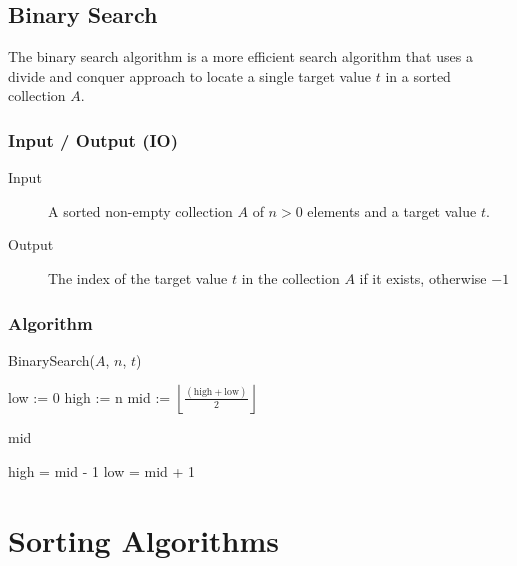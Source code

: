 \documentclass[12pt letter]{report}
\begin{document}
\section{Binary Search}

The binary search algorithm is a more efficient search algorithm that uses a divide and conquer approach to locate a
single target value $t$ in a sorted collection $A$.

\subsection{Input / Output (IO)}

\begin{description}
  \item[Input] A sorted non-empty collection $A$ of $n > 0$ elements and a target value $t$.
  \item[Output] The index of the target value $t$ in the collection $A$ if it exists, otherwise $-1$
\end{description}

\subsection{Algorithm}

\begin{algorithm}[H]
  \caption{BinarySearch($A$, $n$, $t$)}
  \begin{algorithmic}[1]
    \State low := 0
    \State high := n
    \State mid := $\left\lfloor \frac{ \left( \text{high} + \text{low} \right) }{2} \right\rfloor$

    \State \Return mid
    \EndIf

    \State high = mid - 1
    \State low = mid + 1
    \EndIf
    \EndWhile
    \State {}
  \end{algorithmic}
\end{algorithm}

\chapter{Sorting Algorithms}
\end{document}
